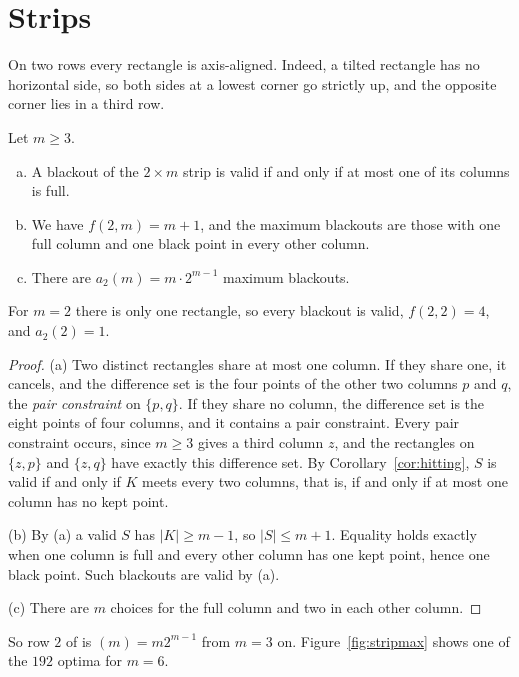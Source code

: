 \section{Strips}\label{sec:strip}

On two rows every rectangle is axis-aligned. Indeed, a tilted rectangle has no
horizontal side, so both sides at a lowest corner go strictly up, and the opposite
corner lies in a third row.

\begin{theorem}\label{thm:strip}
Let $m\ge3$.
\begin{enumerate}[(a)]
\item A blackout of the $2\times m$ strip is valid if and only if at most one of its
columns is full.
\item We have $f(2,m)=m+1$, and the maximum blackouts are those with one full column
and one black point in every other column.
\item There are $a_2(m)=m\cdot2^{m-1}$ maximum blackouts.
\end{enumerate}
For $m=2$ there is only one rectangle, so every blackout is valid, $f(2,2)=4$, and
$a_2(2)=1$.
\end{theorem}

\begin{proof}
(a) Two distinct rectangles share at most one column. If they
share one, it cancels, and the difference set is the four points of the other two
columns $p$ and $q$, the \emph{pair constraint} on $\{p,q\}$. If they share
no column, the difference set is the eight points of four columns, and it contains a
pair constraint. Every pair constraint occurs, since $m\ge3$ gives a third column $z$,
and the rectangles on $\{z,p\}$ and $\{z,q\}$ have exactly this difference set. By
Corollary~\ref{cor:hitting}, $S$ is valid if and only if $K$ meets every two columns,
that is, if and only if at most one column has no kept point.

(b) By (a) a valid $S$ has $|K|\ge m-1$, so $|S|\le m+1$. Equality holds exactly when
one column is full and every other column has one kept point, hence one black point.
Such blackouts are valid by (a).

(c) There are $m$ choices for the full column and two in each other column.
\end{proof}

So row $2$ of  is $(m)=m2^{m-1}$ from $m=3$ on.
Figure~\ref{fig:stripmax} shows one of the $192$ optima for $m=6$.

